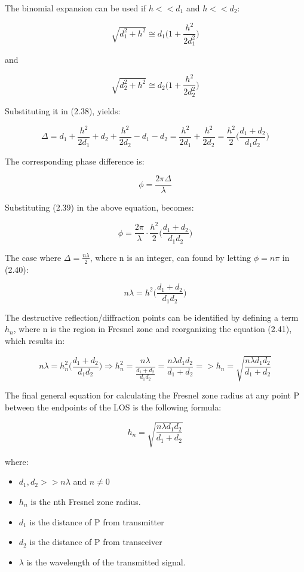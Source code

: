 The binomial expansion can be used if $h<<d_1$ and $h<<d_2$:

$$\sqrt{d_1^2+h^2} \cong d_1 \Big(1+\frac{h^2}{2d_1^2} \Big) $$

and

$$\sqrt{d_2^2+h^2} \cong d_2 \Big(1+\frac{h^2}{2d_2^2} \Big) $$

Substituting it in (2.38), yields:

\begin{equation}
  \Delta=d_1+\frac{h^2}{2d_1}+d_2+\frac{h^2}{2d_2}-d_1-d_2 = \frac{h^2}{2d_1} + \frac{h^2}{2d_2} = \frac{h^2}{2}\Big(\frac{d_1+d_2}{d_1d_2}\Big)
\end{equation}

The corresponding phase difference is: 

$$\phi = \frac{2\pi \Delta}{\lambda}$$

Substituting (2.39) in the above equation, becomes: 

\begin{equation}
  \phi = \frac{2\pi}{\lambda} \cdot \frac{h^2}{2}\Big(\frac{d_1+d_2}{d_1d_2}\Big)
\end{equation}

The case where $\Delta = \frac{n\lambda}{2}$, where n is an integer, can found by letting  $\phi = n\pi$ in (2.40):

\begin{equation}
  n\lambda=h^2\Big(\frac{d_1+d_2}{d_1d_2}\Big)
\end{equation}

The destructive reflection/diffraction points can be identified by defining a term $h_n$, where n is the region in Fresnel zone and reorganizing the equation (2.41), which results in:

\begin{equation}
  n\lambda=h_n^2\Big(\frac{d_1+d_2}{d_1d_2}\Big)\Rightarrow h_n^2= \frac{n\lambda}{\frac{d_1+d_2}{d_1d_2}}=\frac{n\lambda d_1d_2}{d_1+d_2} => h_n = \sqrt{\frac{n\lambda d_1d_2}{d_1+d_2}}
\end{equation}

The final general equation for calculating the Fresnel zone radius at any point P between the endpoints of the LOS is the following formula: 

\begin{equation}
h_n = \sqrt{\frac{n\lambda d_1d_2}{d_1+d_2}}
\end{equation}

where:

\begin{itemize}
  \item $d_1,d_2>>n\lambda$ and $n \neq 0$
  \item $h_n$ is the nth Fresnel zone radius.
  \item $d_1$ is the distance of P from transmitter
  \item $d_2$ is the distance of P from transceiver
  \item $\lambda$ is the wavelength of the transmitted signal.
\end{itemize}

